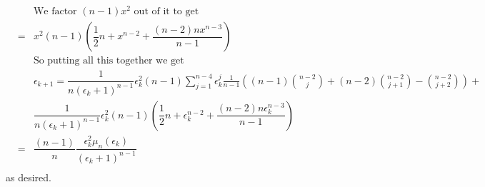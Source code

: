 \documentclass{article}
\begin{document}
\begin{eqnarray*}
&&\textrm{We factor $(n-1)x^2$ out of it to get}\\
	&=& x^2(n-1) \left( \dfrac{1}{2}n + x^{n-2} + \dfrac{(n-2)n x^{n-3}}{n-1} \right)\\
&&\textrm{So putting all this together we get}\\
&&\epsilon_{k+1} = \dfrac{1}{n(\epsilon_k+1)^{n-1}} \epsilon_k^2(n-1)\sum_{j=1}^{n-4}\epsilon_k^j\frac{1}{n-1}
      \left( (n-1) \binom{n-2}{j} + (n-2)\binom{n-2}{j+1} - \binom{n-2}{j+2} \right)+ \\ 
&&\dfrac{1}{n(\epsilon_k+1)^{n-1}} \epsilon_k^2(n-1) \left( \dfrac{1}{2}n + \epsilon_k^{n-2} + \dfrac{(n-2)n \epsilon_k^{n-3}}{n-1} \right)\\
&=& \dfrac{(n-1)}{n} \dfrac{\epsilon_k^2 \mu_n (\epsilon_k)}{(\epsilon_k+1)^{n-1}}\\
\end{eqnarray*}
as desired.
\vspace{1cm}
\end{document}
